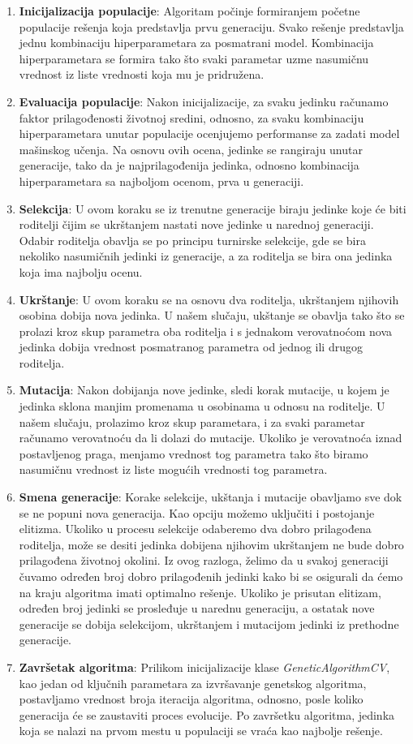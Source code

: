 \documentclass{article}
\begin{document}
\begin{enumerate}
    \item \textbf{Inicijalizacija populacije}: Algoritam počinje formiranjem početne populacije rešenja koja predstavlja prvu generaciju. Svako rešenje predstavlja jednu kombinaciju hiperparametara za posmatrani model. Kombinacija hiperparametara se formira tako što svaki parametar uzme nasumičnu vrednost iz liste vrednosti koja mu je pridružena.
    \item \textbf{Evaluacija populacije}: Nakon inicijalizacije, za svaku jedinku računamo faktor prilagođenosti životnoj sredini, odnosno, za svaku kombinaciju hiperparametara unutar populacije ocenjujemo performanse za zadati model mašinskog učenja. Na osnovu ovih ocena, jedinke se rangiraju unutar generacije, tako da je najprilagođenija jedinka, odnosno kombinacija hiperparametara sa najboljom ocenom, prva u generaciji.
    \item \textbf{Selekcija}: U ovom koraku se iz trenutne generacije biraju jedinke koje će biti roditelji čijim se ukrštanjem nastati nove jedinke u narednoj generaciji. Odabir roditelja obavlja se po principu turnirske selekcije, gde se bira nekoliko nasumičnih jedinki iz generacije, a za roditelja se bira ona jedinka koja ima najbolju ocenu.
    \item \textbf{Ukrštanje}: U ovom koraku se na osnovu dva roditelja, ukrštanjem njihovih osobina dobija nova jedinka. U našem slučaju, ukštanje se obavlja tako što se prolazi kroz skup parametra oba roditelja i s jednakom verovatnoćom nova jedinka dobija vrednost posmatranog parametra od jednog ili drugog roditelja.
    \item \textbf{Mutacija}: Nakon dobijanja nove jedinke, sledi korak mutacije, u kojem je jedinka sklona manjim promenama u osobinama u odnosu na roditelje. U našem slučaju, prolazimo kroz skup parametara, i za svaki parametar računamo verovatnoću da li dolazi do mutacije. Ukoliko je verovatnoća iznad postavljenog praga, menjamo vrednost tog parametra tako što biramo nasumičnu vrednost iz liste mogućih vrednosti tog parametra.
    \item \textbf{Smena generacije}: Korake selekcije, ukštanja i mutacije obavljamo sve dok se ne popuni nova generacija. Kao opciju možemo uključiti i postojanje elitizma. Ukoliko u procesu selekcije odaberemo dva dobro prilagođena roditelja, može se desiti jedinka dobijena njihovim ukrštanjem ne bude dobro prilagođena životnoj okolini. Iz ovog razloga, želimo da u svakoj generaciji čuvamo određen broj dobro prilagođenih jedinki kako bi se osigurali da ćemo na kraju algoritma imati optimalno rešenje. Ukoliko je prisutan elitizam, određen broj jedinki se prosleđuje u narednu generaciju, a ostatak nove generacije se dobija selekcijom, ukrštanjem i mutacijom jedinki iz prethodne generacije.
    \item \textbf{Završetak algoritma}: Prilikom inicijalizacije klase \textit{GeneticAlgorithmCV}, kao jedan od ključnih parametara za izvršavanje genetskog algoritma, postavljamo vrednost broja iteracija algoritma, odnosno, posle koliko generacija će se zaustaviti proces evolucije. Po završetku algoritma, jedinka koja se nalazi na prvom mestu u populaciji se vraća kao najbolje rešenje.
\end{enumerate}
\end{document}
